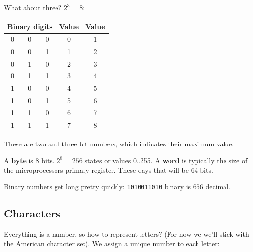 \begin{fullwidth}
What about three? $2^3 = 8$:

\begin{center}
\begin{tabular}{|ccc|c|c|}
\hline
\multicolumn{3}{|c|}{Binary digits} & Value & Value \\
\hline
0 & 0 & 0 & 0 & 1\\
0 & 0 & 1 & 1 & 2\\
0 & 1 & 0 & 2 & 3\\
0 & 1 & 1 & 3 & 4\\
1 & 0 & 0 & 4 & 5\\
1 & 0 & 1 & 5 & 6\\
1 & 1 & 0 & 6 & 7\\
1 & 1 & 1 & 7 & 8\\
\hline
\end{tabular}
\end{center}

These are two and three bit numbers, which indicates their maximum value.

A {\bf byte} is 8 bits. $2^8 = 256$ states or values 0..255.  A {\bf word} is typically the size of the microprocessors primary register. These days that will be 64 bits.

Binary numbers get long pretty quickly: {\tt 1010011010} binary is 666 decimal.

\subsection{Characters}

Everything is a number, so how to represent letters? (For now we we'll stick with the American character set). We assign a unique number to each letter:


\end{fullwidth}

